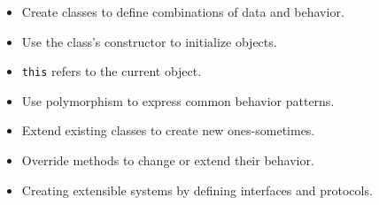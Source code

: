 \begin{itemize}
\item
  Create classes to define combinations of data and behavior.
\item
  Use the class's constructor to initialize objects.
\item
  \texttt{this} refers to the current object.
\item
  Use polymorphism to express common behavior patterns.
\item
  Extend existing classes to create new ones-sometimes.
\item
  Override methods to change or extend their behavior.
\item
  Creating extensible systems by defining interfaces and protocols.
\end{itemize}
